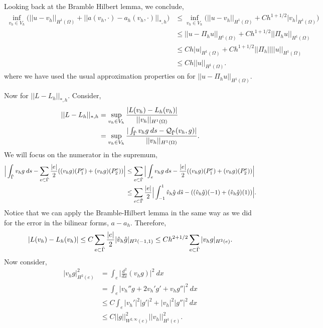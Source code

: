 \documentclass[11pt]{article}
\begin{document}
Looking back at the Bramble Hilbert lemma, we conclude,
\begin{align*}
	\inf_{v_h \in V_h} \big( ||u - v_h||_{H^1(\Omega)} + ||a(v_h, \cdot) - a_h(v_h, \cdot)||_{*,h} \big) &\leq \inf_{v_h \in V_h} \big( ||u - v_h||_{H^1(\Omega)} + Ch^{1+1/2}|v_h|_{H^1(\Omega)} \big) \\
	&\leq ||u - \Pi_h u ||_{H^1(\Omega)} + Ch^{1+1/2} ||\Pi_h u||_{H^1(\Omega)} \\
	&\leq Ch|u|_{H^1(\Omega)} + Ch^{1+1/2} ||\Pi_h|| ||u||_{H^1(\Omega)} \\
    &\leq Ch ||u||_{H^1(\Omega)}.
\end{align*}
where we have used the usual approximation properties on for $||u - \Pi_h u ||_{H^1(\Omega)}$.

Now for $||L - L_h||_{*,h}$.
Consider,
\begin{align*}
    ||L - L_h||_{*,h} &= \sup_{v_h \in V_h} \frac{|L(v_h) - L_h(v_h)|}{||v_h||_{H^1(\Omega)}} \\
    &= \sup_{v_h \in V_h} \frac{|\int_{\Tilde{\Gamma}} v_h g \: ds - \mathcal{Q}_{\Tilde{\Gamma}} (v_h, g)|}{||v_h||_{H^1(\Omega)}}.
\end{align*}
We will focus on the numerator in the supremum,
\begin{align*}
    \Big| \int_{\Tilde{\Gamma}} v_h g \: ds - \sum_{e \subset \Tilde{\Gamma}} \frac{|e|}{2} ( (v_hg)(P^e_1) + (v_hg)(P^e_2) ) \Big| &\leq \sum_{e \subset \Tilde{\Gamma}} \Big| \int_e v_h g \: ds - \frac{|e|}{2} ( (v_hg)(P^e_1) + (v_h g)(P^e_2) ) \Big| \\
    &\leq \sum_{e \subset \Tilde{\Gamma}} \frac{|e|}{2} \Big| \int_{-1}^1 \Hat{v}_h \Hat{g} \: d\Hat{s} - ( (\Hat{v}_h \Hat{g})(-1) + (\Hat{v}_h \Hat{g})(1) ) \Big|.
\end{align*}
Notice that we can apply the Bramble-Hilbert lemma in the same way as we did for the error in the bilinear forms, $a - a_h$.
Therefore,
\begin{equation*}
    |L(v_h) - L_h(v_h)| \leq C\sum_{e \subset \Tilde{\Gamma}} \frac{|e|}{2} |\Hat{v}_h \Hat{g}|_{H^2(-1,1)} \leq Ch^{2+1/2} \sum_{e \subset \Tilde{\Gamma}} |v_h g|_{H^2(e)}.
\end{equation*}
Now consider,
\begin{align*}
    |v_h g|_{H^2(e)}^2 &= \int_e \Big| \frac{d^2}{dx} (v_h g) \Big|^2 \: dx \\
    &= \int_e | v_h'' g + 2 v_h' g' + v_h g''|^2 \: dx \\
    &\leq C \int_e |v_h'|^2 |g'|^2 + |v_h|^2 |g''|^2 \: dx \\
    &\leq C ||g||^2_{W^{2,\infty}(e)} ||v_h||^2_{H^1(e)}.
\end{align*}
\end{document}
